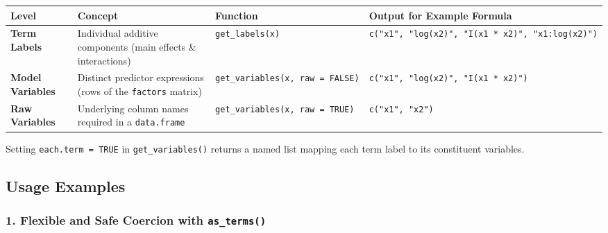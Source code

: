 \documentclass[
]{article}
\newcounter{none} %
\begin{document}
{\def\LTcaptype{none} %
\begin{longtable}[]{@{}
  >{\raggedright\arraybackslash}p{}
  >{\raggedright\arraybackslash}p{}
  >{\raggedright\arraybackslash}p{}
  >{\raggedright\arraybackslash}p{}@{}}
\toprule\noalign{}
\begin{minipage}[b]{\linewidth}\raggedright
Level
\end{minipage} & \begin{minipage}[b]{\linewidth}\raggedright
Concept
\end{minipage} & \begin{minipage}[b]{\linewidth}\raggedright
Function
\end{minipage} & \begin{minipage}[b]{\linewidth}\raggedright
Output for Example Formula
\end{minipage} \\
\midrule\noalign{}
\endhead
\bottomrule\noalign{}
\endlastfoot
\textbf{Term Labels} & Individual additive components (main effects \&
interactions) & \texttt{get\_labels(x)} &
\texttt{c("x1",\ "log(x2)",\ "I(x1\ *\ x2)",\ "x1:log(x2)")} \\
\textbf{Model Variables} & Distinct predictor expressions (rows of the
\texttt{factors} matrix) & \texttt{get\_variables(x,\ raw\ =\ FALSE)} &
\texttt{c("x1",\ "log(x2)",\ "I(x1\ *\ x2)")} \\
\textbf{Raw Variables} & Underlying column names required in a
\texttt{data.frame} & \texttt{get\_variables(x,\ raw\ =\ TRUE)} &
\texttt{c("x1",\ "x2")} \\
\end{longtable}
}

Setting \texttt{each.term\ =\ TRUE} in \texttt{get\_variables()} returns
a named list mapping each term label to its constituent variables.

\subsection{Usage Examples}\label{usage-examples}

\subsubsection{\texorpdfstring{1. Flexible and Safe Coercion with
\texttt{as\_terms()}}{1. Flexible and Safe Coercion with as\_terms()}}\label{flexible-and-safe-coercion-with-as_terms}
\end{document}
